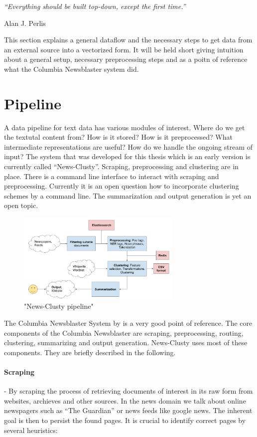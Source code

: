 \epigraph{\emph{
  ``Everything should be built top-down, except the first time.''
}}{ Alan J. Perlis }
 
This section explains a general dataflow and the necessary steps to get data from an external source into a vectorized form. It will be held short giving intuition about a general setup, necessary preprocessing steps and as a poitn of reference what the Columbia Newsblaster system did.

\section{Pipeline}
  A data pipeline for text data has various modules of interest. Where do we get the textutal content from? How is it stored? How is it preprocessed? What intermediate representations are useful? How do we handle the ongoing stream of input? The system that was developed for this thesis which is an early version is currently called ``News-Clusty''. Scraping, preprocessing and clustering are in place. There is a command line interface to interact with scraping and preprocessing. Currently it is an open question how to incorporate clustering schemes by a command line. The summarization and output generation is yet an open topic.

  \begin{figure}[h!]
    \centering
      \includegraphics[width=0.7\textwidth]{news_clusty.png}
      \caption{"News-Clusty pipeline"}
      \label{news_clusty}
  \end{figure}

  The Columbia Newsblaster System by \cite{ColumbiaMultiDoc2001} is a very good point of reference. The core components of the Columbia Newsblaster are scraping, preprocessing, routing, clustering, summarizing and output generation. News-Clusty uses most of these components. They are briefly described in the following.

  \paragraph{Scraping} - By scraping the process of retrieving documents of interest in its raw form from websites, archieves and other sources. In the news domain we talk about online newspagers such as ``The Guardian'' or news feeds like google news. The inherent goal is then to persist the found pages. It is crucial to identify correct pages by several heuristics:

